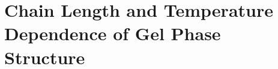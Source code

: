 \chapter{Chain Length and Temperature Dependence of Gel Phase Structure}
\label{gel_long_chap}






